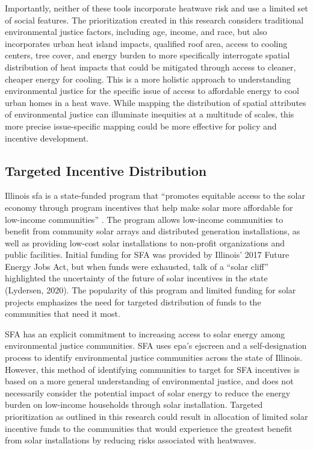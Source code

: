 Importantly, neither of these tools incorporate heatwave risk and use a limited
set of social features. The prioritization created in this research considers
traditional environmental justice factors, including age, income, and race, but
also incorporates urban heat island impacts, qualified roof area, access to cooling
centers, tree cover, and energy burden to more specifically interrogate spatial
distribution of heat impacts that could be mitigated through access to cleaner,
cheaper energy for cooling. This is a more holistic approach to understanding
environmental justice for the specific issue of access to affordable energy to
cool urban homes in a heat wave. While mapping the distribution of spatial
attributes of environmental justice can illuminate inequities at a multitude of
scales, this more precise issue-specific mapping could be more effective for
policy and incentive development.

\subsection{Targeted Incentive Distribution}

Illinois \ac{sfa} is a state-funded program that “promotes equitable access to
the solar economy through program incentives that help make solar more affordable
for low-income communities” \cite{illinois_solar_for_all_environmental_2022}. The
program allows low-income communities to benefit from community solar arrays and
distributed generation installations, as well as providing low-cost solar
installations to non-profit organizations and public facilities. Initial funding
for SFA was provided by Illinois' 2017 Future Energy Jobs Act, but when funds were
exhausted, talk of a “solar cliff” highlighted the uncertainty of the future of
solar incentives in the state (Lydersen, 2020). The popularity of this program
and limited funding for solar projects emphasizes the need for targeted distribution
of funds to the communities that need it most.

SFA has an explicit commitment to increasing access to solar energy among
environmental justice communities. SFA uses \ac{epa}’s \ac{ejscreen} and a
self-designation  process to identify environmental justice communities across
the state of Illinois. However, this method of identifying communities to target
for SFA incentives is based on a more general understanding of environmental
justice, and does not necessarily consider the potential impact of solar energy
to reduce the energy burden on low-income households through solar installation.
Targeted prioritization as outlined in this research could result in allocation
of limited solar incentive funds to the communities that would experience the
greatest benefit from solar installations by reducing risks associated with heatwaves.

